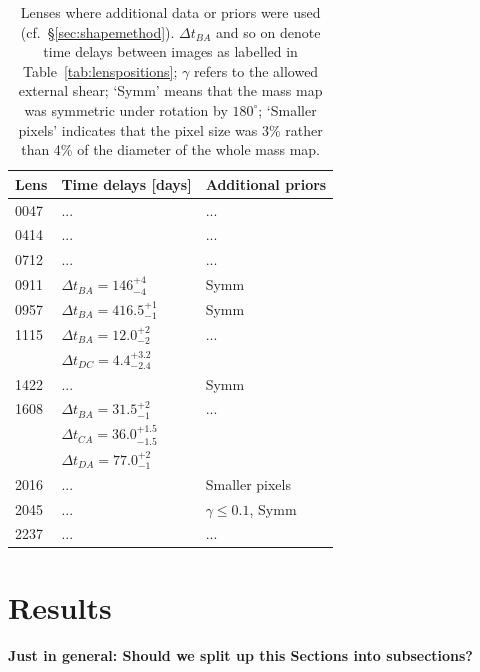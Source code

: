 \documentclass[useAMS,usenatbib]{mn2e}
\begin{document}
\begin{table}
  \begin{center}
    \begin{tabular}{l l l}
      Lens & Time delays [days] & Additional priors \\ \hline
      0047 & ... & ...\\
      0414 & ... & ...\\
      0712 & ... & ...\\
      0911 & $\Delta t_{BA}=146^{+4}_{-4}$ & Symm\\
      0957 & $\Delta t_{BA}=416.5^{+1}_{-1}$ & Symm \\
      1115 & $\Delta t_{BA}=12.0^{+2}_{-2}$ & ...\\
           & $\Delta t_{DC}=4.4^{+3.2}_{-2.4}$ & \\
      1422 & ... & Symm \\
      1608 & $\Delta t_{BA}=31.5^{+2}_{-1}$ & ...\\
           & $\Delta t_{CA}=36.0^{+1.5}_{-1.5}$ & \\
           & $\Delta t_{DA}=77.0^{+2}_{-1}$ & \\
      2016 & ... & Smaller pixels \\
      2045 & ... & $\gamma\leq 0.1$, Symm \\
      2237 & ... & ...\\
    \end{tabular}
    \caption[width=\linewidth]{Lenses where additional data or priors
      were used (cf.~\S\ref{sec:shapemethod}). $\Delta t_{BA}$ and so
      on denote time delays between images as labelled in
      Table~\ref{tab:lenspositions}; $\gamma$ refers to the allowed
      external shear; `Symm' means that the mass map was symmetric
      under rotation by $180^\circ$; `Smaller pixels' indicates that
      the pixel size was 3\% rather than 4\% of the diameter of the
      whole mass map.}
    \label{tab:lenspriors}
  \end{center}
\end{table}


\section{Results}\label{sec:results}
\textbf{Just in general: Should we split up this Sections into subsections?}
\end{document}
